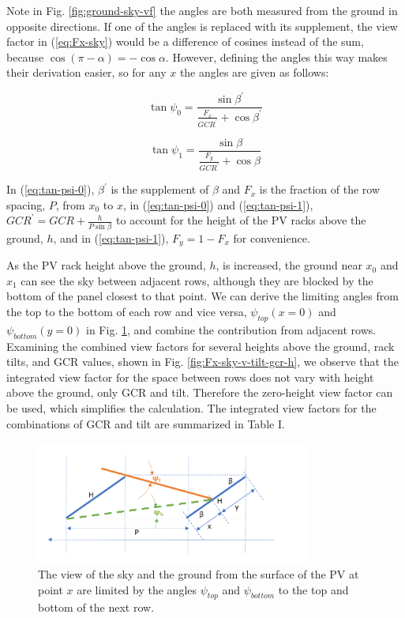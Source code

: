 \documentclass[conference]{IEEEtran}
\begin{document}
Note in Fig. \ref{fig:ground-sky-vf} the angles are both measured from the ground in opposite directions.  If one of the angles is replaced with its supplement, the view factor in (\ref{eq:Fx-sky}) would be a difference of cosines instead of the sum, because $\cos \left(\pi - \alpha\right) = -\cos \alpha$.  However, defining the angles this way makes their derivation easier, so for any $x$ the angles are given as follows:

\begin{equation}
\tan \psi_0 = \frac{\sin \beta^\prime}{\frac{F_x}{GCR^\prime} + \cos \beta^\prime}
\label{eq:tan-psi-0}
\end{equation}

\begin{equation}
\tan \psi_1 = \frac{\sin \beta}{\frac{F_y}{GCR^\prime} + \cos \beta}
\label{eq:tan-psi-1}
\end{equation}

In (\ref{eq:tan-psi-0}), $\beta^\prime$ is the supplement of $\beta$ and $F_x$ is the fraction of the row spacing, $P$, from $x_0$ to $x$, in (\ref{eq:tan-psi-0}) and (\ref{eq:tan-psi-1}), $GCR^\prime=GCR+\frac{h}{P\sin\beta}$ to account for the height of the PV racks above the ground, $h$, and in (\ref{eq:tan-psi-1}), $F_y=1-F_x$ for convenience.

As the PV rack height above the ground, $h$, is increased, the ground near $x_0$ and $x_1$ can see the sky between adjacent rows, although they are blocked by the bottom of the panel closest to that point.  We can derive the limiting angles from the top to the bottom of each row and vice versa, $\psi_{top}\left(x=0\right)$ and $\psi_{bottom}\left(y=0\right)$ in Fig. \ref{fig:nextrow-vf-angles}, and combine the contribution from adjacent rows.  Examining the combined view factors for several heights above the ground, rack tilts, and GCR values, shown in Fig. \ref{fig:Fx-sky-v-tilt-gcr-h}, we observe that the integrated view factor for the space between rows does not vary with height above the ground, only GCR and tilt.  Therefore the zero-height view factor can be used, which simplifies the calculation.  The integrated view factors for the combinations of GCR and tilt are summarized in Table I.

\begin{figure}
\centering
\includegraphics[width=9cm]{next-row-view-factor-angles.png}
\caption{The view of the sky and the ground from the surface of the PV at point $x$ are limited by the angles $\psi_{top}$ and $\psi_{bottom}$ to the top and bottom of the next row.}
\label{fig:nextrow-vf-angles}
\end{figure}
\end{document}
